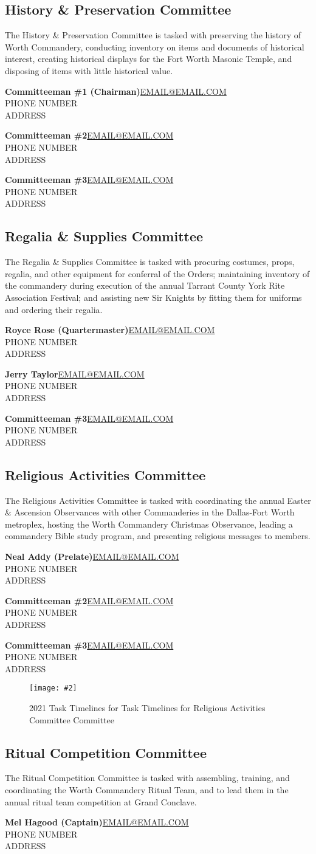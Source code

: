 \documentclass[letterpaper]{article}
\newcommand{\cman}[4]{\textbf{#1}\hfill{}\url{#2}\\\hphantom{0em}\hfill{}#3\\\hphantom{0em}\hfill{}#4}
\newcommand{\comm}[3]{\subsection*{#1 Committee\textsuperscript{#2}}The #1 Committee is tasked with #3\bigskip}
\newcommand{\gantt}[2]{
	\newgeometry{margin=0.125in}
	\begin{landscape}
		\begin{figure}
			\vspace*{\fill}
			\centering
			\caption{2021 Task Timelines for #1 Committee}
			\texttt{[image: \#2]}%
			\vspace*{\fill}
		\end{figure}
	\end{landscape}
	\restoregeometry
}
\begin{document}
	\pagebreak
	
	\comm{History \& Preservation}{}{preserving the history of Worth Commandery, conducting inventory on items and documents of historical interest, creating historical displays for the Fort Worth Masonic Temple, and disposing of items with little historical value.}
	
		\cman{Committeeman \#1 (Chairman)}{EMAIL@EMAIL.COM}{PHONE NUMBER}{ADDRESS}
		
		\cman{Committeeman \#2}{EMAIL@EMAIL.COM}{PHONE NUMBER}{ADDRESS}
		
		\cman{Committeeman \#3}{EMAIL@EMAIL.COM}{PHONE NUMBER}{ADDRESS}
	
	\pagebreak
	
	\comm{Regalia \& Supplies}{}{procuring costumes, props, regalia, and other equipment for conferral of the Orders; maintaining inventory of the commandery during execution of the annual Tarrant County York Rite Association Festival; and assisting new Sir Knights by fitting them for uniforms and ordering their regalia.}
	
		\cman{Royce Rose (Quartermaster)}{EMAIL@EMAIL.COM}{PHONE NUMBER}{ADDRESS}
		
		\cman{Jerry Taylor}{EMAIL@EMAIL.COM}{PHONE NUMBER}{ADDRESS}
		
		\cman{Committeeman \#3}{EMAIL@EMAIL.COM}{PHONE NUMBER}{ADDRESS}

	\pagebreak

	\comm{Religious Activities}{}{coordinating the annual Easter \& Ascension Observances with other Commanderies in the Dallas-Fort Worth metroplex, hosting the Worth Commandery Christmas Observance, leading a commandery Bible study program, and presenting religious messages to members.}
	
		\cman{Neal Addy (Prelate)}{EMAIL@EMAIL.COM}{PHONE NUMBER}{ADDRESS}
		
		\cman{Committeeman \#2}{EMAIL@EMAIL.COM}{PHONE NUMBER}{ADDRESS}
		
		\cman{Committeeman \#3}{EMAIL@EMAIL.COM}{PHONE NUMBER}{ADDRESS}
	
		\gantt{Task Timelines for Religious Activities Committee}{2021GanttReligious.pdf}
	
	\pagebreak
		
	\comm{Ritual Competition}{}{assembling, training, and coordinating the Worth Commandery Ritual Team, and to lead them in the annual ritual team competition at Grand Conclave.}
	
		\cman{Mel Hagood (Captain)}{EMAIL@EMAIL.COM}{PHONE NUMBER}{ADDRESS}
		
\end{document}
